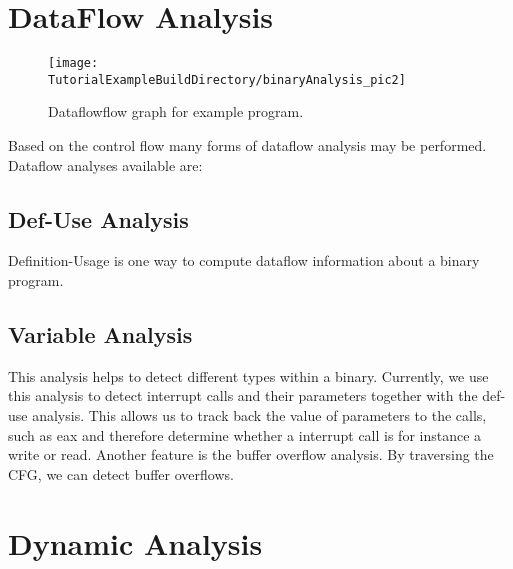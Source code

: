 


\section{DataFlow Analysis}

\begin{figure}
\texttt{[image: \\TutorialExampleBuildDirectory/binaryAnalysis\_pic2]}
\caption{Dataflowflow graph for example program.}
\label{Tutorial:examplefig2}
\end{figure}

Based on the control flow many forms of dataflow analysis may be performed.
Dataflow analyses available are:
 
\subsection{Def-Use Analysis}

Definition-Usage is one way to compute dataflow information about a binary program.

\subsection{Variable Analysis}

This analysis helps to detect different types within a binary.
Currently, we use this analysis to detect interrupt calls and their parameters together with the def-use analysis.
This allows us to track back the value of parameters to the calls, such as eax and therefore 
determine whether a interrupt call is for instance a write or read.
Another feature is the buffer overflow analysis. By traversing the CFG, we can detect buffer overflows.


\section{Dynamic Analysis}

